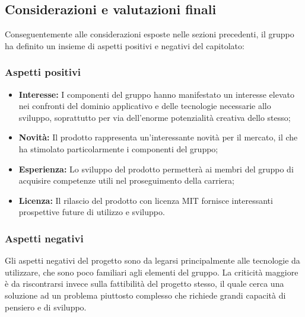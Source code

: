   \subsection{Considerazioni e valutazioni finali}
    Conseguentemente alle considerazioni esposte nelle sezioni precedenti, il gruppo ha definito un
    insieme di aspetti positivi e negativi del capitolato:
    \subsubsection{Aspetti positivi}
      \begin{itemize}
        \item \textbf{Interesse:} I componenti del gruppo hanno manifestato un interesse elevato nei confronti del dominio applicativo e delle tecnologie necessarie
        allo sviluppo, soprattutto per via dell'enorme potenzialità creativa dello stesso;
        \item \textbf{Novità:} Il prodotto rappresenta un'interessante novità per il mercato, il che ha stimolato particolarmente i componenti del gruppo;
        \item \textbf{Esperienza:} Lo sviluppo del prodotto permetterà ai membri del gruppo di acquisire competenze utili nel proseguimento della carriera;
        \item \textbf{Licenza:} Il rilascio del prodotto con licenza MIT fornisce interessanti
         prospettive future di utilizzo e sviluppo.
     \end{itemize}
   \subsubsection{Aspetti negativi}
    Gli aspetti negativi del progetto sono da legarsi principalmente alle tecnologie da utilizzare, che sono poco familiari agli elementi del gruppo.
    La criticità maggiore è da riscontrarsi invece sulla fattibilità del progetto stesso, il quale cerca una soluzione ad un problema piuttosto complesso che richiede grandi
    capacità di pensiero e di sviluppo.
